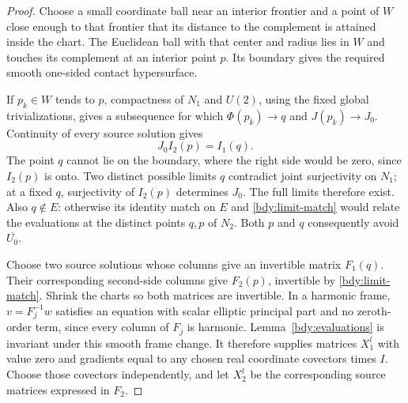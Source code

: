 \begin{proof}
Choose a small coordinate ball near an interior frontier and a
point of \(W\) close enough to that frontier that its distance
to the complement is attained inside the chart.  The Euclidean
ball with that center and radius lies in \(W\) and touches its
complement at an interior point \(p\).  Its boundary gives the
required smooth one-sided contact hypersurface.

If \(p_k\in W\) tends to \(p\), compactness of \(N_1\) and
\(U(2)\), using the fixed global trivializations, gives a
subsequence for which \(\Phi(p_k)\to q\) and \(J(p_k)\to J_0\).
Continuity of every source solution gives
\begin{equation}\label{bdy:limit-match}
                         J_0 I_2(p)=I_1(q).
\end{equation}
The point \(q\) cannot lie on the boundary, where the right side
would be zero, since \(I_2(p)\) is onto.  Two distinct possible
limits \(q\) contradict joint surjectivity on \(N_1\); at a fixed
\(q\), surjectivity of \(I_2(p)\) determines \(J_0\).  The full
limits therefore exist.  Also \(q\notin E\): otherwise its
identity match on \(E\) and \eqref{bdy:limit-match} would relate
the evaluations at the distinct points \(q,p\) of \(N_2\).
Both \(p\) and \(q\) consequently avoid \(\overline{U_0}\).

Choose two source solutions whose columns give an invertible
matrix \(F_1(q)\).  Their corresponding second-side columns give
\(F_2(p)\), invertible by \eqref{bdy:limit-match}.  Shrink the
charts so both matrices are invertible.  In a harmonic frame,
\(v=F_j^{-1}w\) satisfies an equation with scalar elliptic
principal part and no zeroth-order term, since every column of
\(F_j\) is harmonic.  Lemma~\ref{bdy:evaluations} is invariant
under this smooth frame change.  It therefore supplies matrices
\(X_1^l\) with value zero and gradients equal to any chosen real
coordinate covectors times \(I\).  Choose those covectors
independently, and let \(X_2^l\) be the corresponding source
matrices expressed in \(F_2\).


\end{proof}
